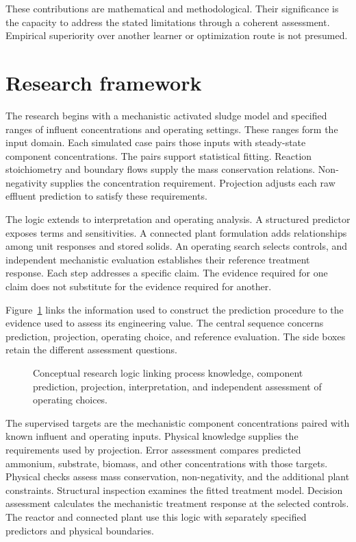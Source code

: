 These contributions are mathematical and methodological. Their significance is the capacity to address the stated limitations through a coherent assessment. Empirical superiority over another learner or optimization route is not presumed.

\section{Research framework}

The research begins with a mechanistic activated sludge model and specified ranges of influent concentrations and operating settings. These ranges form the input domain. Each simulated case pairs those inputs with steady-state component concentrations. The pairs support statistical fitting. Reaction stoichiometry and boundary flows supply the mass conservation relations. Non-negativity supplies the concentration requirement. Projection adjusts each raw effluent prediction to satisfy these requirements.

The logic extends to interpretation and operating analysis. A structured predictor exposes terms and sensitivities. A connected plant formulation adds relationships among unit responses and stored solids. An operating search selects controls, and independent mechanistic evaluation establishes their reference treatment response. Each step addresses a specific claim. The evidence required for one claim does not substitute for the evidence required for another.

Figure~\ref{fig:research_conceptual_logic} links the information used to construct the prediction procedure to the evidence used to assess its engineering value. The central sequence concerns prediction, projection, operating choice, and reference evaluation. The side boxes retain the different assessment questions.

\begin{figure}[htbp]
\centering

\caption{Conceptual research logic linking process knowledge, component prediction, projection, interpretation, and independent assessment of operating choices.}
\label{fig:research_conceptual_logic}
\end{figure}

The supervised targets are the mechanistic component concentrations paired with known influent and operating inputs. Physical knowledge supplies the requirements used by projection. Error assessment compares predicted ammonium, substrate, biomass, and other concentrations with those targets. Physical checks assess mass conservation, non-negativity, and the additional plant constraints. Structural inspection examines the fitted treatment model. Decision assessment calculates the mechanistic treatment response at the selected controls. The reactor and connected plant use this logic with separately specified predictors and physical boundaries.


